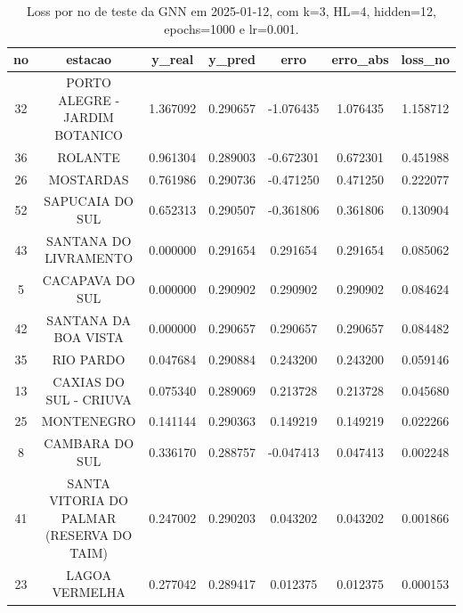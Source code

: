 \begin{table}[h]
\centering
\caption{Loss por no de teste da GNN em 2025-01-12, com k=3, HL=4, hidden=12, epochs=1000 e lr=0.001.}
\label{tab:gnn_loss_k3_hl4_h12_e1000_d20250112}
\begin{tabular}{ccccccc}
\toprule
no & estacao & y\_real & y\_pred & erro & erro\_abs & loss\_no \\
\midrule
32 & PORTO ALEGRE - JARDIM BOTANICO & 1.367092 & 0.290657 & -1.076435 & 1.076435 & 1.158712 \\
36 & ROLANTE & 0.961304 & 0.289003 & -0.672301 & 0.672301 & 0.451988 \\
26 & MOSTARDAS & 0.761986 & 0.290736 & -0.471250 & 0.471250 & 0.222077 \\
52 & SAPUCAIA DO SUL & 0.652313 & 0.290507 & -0.361806 & 0.361806 & 0.130904 \\
43 & SANTANA DO LIVRAMENTO & 0.000000 & 0.291654 & 0.291654 & 0.291654 & 0.085062 \\
5 & CACAPAVA DO SUL & 0.000000 & 0.290902 & 0.290902 & 0.290902 & 0.084624 \\
42 & SANTANA DA BOA VISTA & 0.000000 & 0.290657 & 0.290657 & 0.290657 & 0.084482 \\
35 & RIO PARDO & 0.047684 & 0.290884 & 0.243200 & 0.243200 & 0.059146 \\
13 & CAXIAS DO SUL - CRIUVA & 0.075340 & 0.289069 & 0.213728 & 0.213728 & 0.045680 \\
25 & MONTENEGRO & 0.141144 & 0.290363 & 0.149219 & 0.149219 & 0.022266 \\
8 & CAMBARA DO SUL & 0.336170 & 0.288757 & -0.047413 & 0.047413 & 0.002248 \\
41 & SANTA VITORIA DO PALMAR (RESERVA DO TAIM) & 0.247002 & 0.290203 & 0.043202 & 0.043202 & 0.001866 \\
23 & LAGOA VERMELHA & 0.277042 & 0.289417 & 0.012375 & 0.012375 & 0.000153 \\
\bottomrule
\end{tabular}
\end{table}
